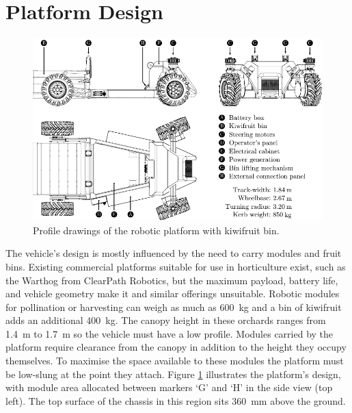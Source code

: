 \documentclass[preprint,authoryear,12pt]{elsarticle}
\begin{document}
\section{Platform Design}
\label{sect:design}

        \begin{figure}[htb]
            \centering
            \includegraphics[width=\linewidth]{imgs/profile_views/AMMP-All-Labelled.pdf}
            \caption{Profile drawings of the robotic platform with kiwifruit bin.}
            \label{fig:AMMP}
        \end{figure}

        The vehicle's design is mostly influenced by the need to carry modules and fruit bins.
        Existing commercial platforms suitable for use in horticulture exist, such as the Warthog from ClearPath Robotics, but the maximum payload, battery life, and vehicle geometry make it and similar offerings unsuitable.
        Robotic modules for pollination or harvesting can weigh as much as \SI{600}{\kilo\gram} and a bin of kiwifruit adds an additional \SI{400}{\kilo\gram}.
        The canopy height in these orchards ranges from \SI{1.4}{\meter} to \SI{1.7}{\meter} so the vehicle must have a low profile.
        Modules carried by the platform require clearance from the canopy in addition to the height they occupy themselves.
        To maximise the space available to these modules the platform must be low-slung at the point they attach.
        Figure \ref{fig:AMMP} illustrates the platform's design, with module area allocated between markers `G' and `H' in the side view (top left).
        The top surface of the chassis in this region sits \SI{360}{\milli\meter} above the ground.
\end{document}
